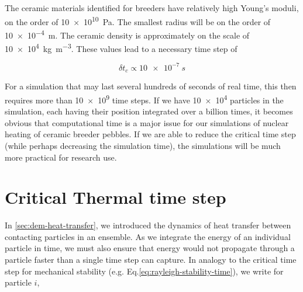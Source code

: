 
The ceramic materials identified for breeders have relatively high Young's moduli, on the order of \SI{10e10}{\pascal}. The smallest radius will be on the order of \SI{10e-4}{\meter}. The ceramic density is approximately on the scale of \SI{10e4}{\kilogram\per\cubic\meter}. These values lead to a necessary time step of

\begin{equation}
	\delta t_c \propto \SI{10e-7}{s}
\end{equation}

For a simulation that may last several hundreds of seconds of real time, this then requires more than \num{10e9} time steps. If we have \num{10e4} particles in the simulation, each having their position integrated over a billion times, it becomes obvious that computational time is a major issue for our simulations of nuclear heating of ceramic breeder pebbles. If we are able to reduce the critical time step (while perhaps decreasing the simulation time), the simulations will be much more practical for research use.




\section{Critical Thermal time step}

In \cref{sec:dem-heat-transfer}, we introduced the dynamics of heat transfer between contacting particles in an ensemble. As we integrate the energy of an individual particle in time, we must also ensure that energy would not propagate through a particle faster than a single time step can capture. In analogy to the critical time step for mechanical stability (e.g. Eq.\ref{eq:rayleigh-stability-time}), we write for particle $i$,

